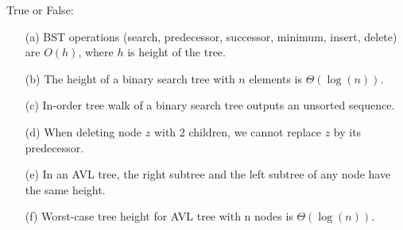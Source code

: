 \noindent {} 
True or False: 
\begin{itemize}
    \item[(a)] BST operations (search, predecessor, successor, minimum, insert, delete) are $O(h)$, where $h$ is height of the tree. \hfill {}
    \item[(b)] The height of a binary search tree with $n$ elements is $\Theta(\log(n))$. \hfill {}
    \item[(c)] In-order tree walk of a binary search tree outputs an unsorted sequence. \hfill {}
    \item[(d)] When deleting node $z$ with 2 children, we cannot replace $z$ by its predecessor. \hfill {}
    \item[(e)] In an AVL tree, the right subtree and the left subtree of any node have the same height. \hfill {}
    \item[(f)] Worst-case tree height for AVL tree with n nodes is $\Theta(\log(n))$. \hfill {} \\
\end{itemize}